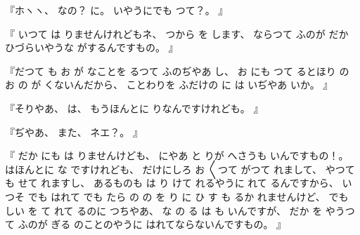 %
『ホヽヽ、
%
なの？\inhibitglue{}%
に。
%
いやうにでも
つて？。
』

%
『
いつて
は
りませんけれどもネ、
%
つから
を
します、
%
ならつて
ふのが
だか
ひづらいやうな
がするんですもの。
』

%
『だつて
も
お
が
なことを
るつて
ふのぢやあ
し、
%
お
にも
つて
るとほり
の
お
の
が
くないんだから、
%
ことわりを
ふだけの
に
は
いぢやあ
いか。
』

%
『そりやあ、
%
は、
%
もうほんとに
りなんですけれども。
』

%
『ぢやあ、
%
また、
%
ネエ？。
』

%
『
だか
にも
は
りませんけども、
%
にやあ
と
りが
へさうも
いんですもの！。
%
はほんとに
な
ですけれども、
%
だけにしろ
お
〳〵つて
がつて
れまして、
%
やつて
も
せて
れますし、
%
あるものも
は
り
けて
れるやうに
れて
るんですから、
%
いつそ
でも
はれて
でも
たら
の
の
を
り
に
ひ
す
も
るか
れませんけど、
%
でも
しい
を
て
れて
るのに
つちやあ、
%
な
の
る
は
も
いんですが、
%
だか
を
やうつて
ふのが
ぎる
のことのやうに
はれてならないんですもの。
』

